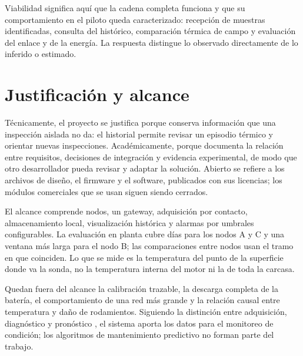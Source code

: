 Viabilidad significa aquí que la cadena completa funciona y que su comportamiento en el piloto queda caracterizado: recepción de muestras identificadas, consulta del histórico, comparación térmica de campo y evaluación del enlace y de la energía. La respuesta distingue lo observado directamente de lo inferido o estimado.

\section{Justificación y alcance}
Técnicamente, el proyecto se justifica porque conserva información que una inspección aislada no da: el historial permite revisar un episodio térmico y orientar nuevas inspecciones. Académicamente, porque documenta la relación entre requisitos, decisiones de integración y evidencia experimental, de modo que otro desarrollador pueda revisar y adaptar la solución. Abierto se refiere a los archivos de diseño, el firmware y el software, publicados con sus licencias; los módulos comerciales que se usan siguen siendo cerrados.

El alcance comprende \NumeroNodos{} nodos, un gateway, adquisición por contacto, almacenamiento local, visualización histórica y alarmas por umbrales configurables. La evaluación en planta cubre \DuracionComunDias{} días para los nodos A y C y una ventana más larga para el nodo B; las comparaciones entre nodos usan el tramo en que coinciden. Lo que se mide es la temperatura del punto de la superficie donde va la sonda, no la temperatura interna del motor ni la de toda la carcasa.

Quedan fuera del alcance la calibración trazable, la descarga completa de la batería, el comportamiento de una red más grande y la relación causal entre temperatura y daño de rodamientos. Siguiendo la distinción entre adquisición, diagnóstico y pronóstico \citep{jardine2006,cinar2020}, el sistema aporta los datos para el monitoreo de condición; los algoritmos de mantenimiento predictivo no forman parte del trabajo.
